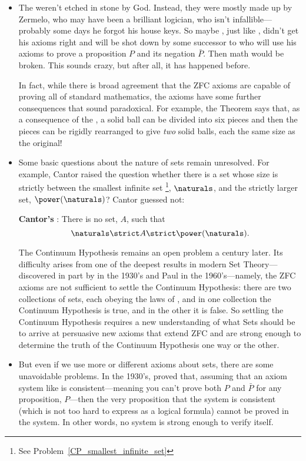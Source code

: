%
\begin{itemize}

\item The  weren't etched in stone by God.  Instead,
  they were mostly made up by Zermelo, who may have been a brilliant
  logician, who isn't infallible---probably some days he forgot his
  house keys.  So maybe , just like , didn't
  get his axioms right and will be shot down by some successor to
   who will use his axioms to prove a proposition $P$ and
  its negation $\bar{P}$.  Then math would be broken.  This sounds
  crazy, but after all, it has happened before.

  In fact, while there is broad agreement that the ZFC axioms are capable
  of proving all of standard mathematics, the axioms have some further
  consequences that sound paradoxical.  For example, the 
  Theorem says that, as a consequence of the , a solid ball
  can be divided into six pieces and then the pieces can be rigidly
  rearranged to give \emph{two} solid balls, each the same size as the
  original!

\item Some basic questions about the nature of sets remain unresolved.
  For example, Cantor raised the question whether there is a set whose
  size is strictly between the smallest infinite set \footnote{See
    Problem~\ref{CP_smallest_infinite_set}}, $\naturals$, and the
  strictly larger set, $\power(\naturals)$?  Cantor guessed not:

  \textbf{Cantor's }: There is no set, $A$,
  such that
  \[
  \naturals \strict A \strict \power(\naturals).
  \]

  The Continuum Hypothesis remains an open problem a century later.
  Its difficulty arises from one of the deepest results in modern Set
  Theory---discovered in part by  in the 1930's and Paul
   in the 1960's---namely, the ZFC axioms are not
  sufficient to settle the Continuum Hypothesis: there are two
  collections of sets, each obeying the laws of , and in one
  collection the Continuum Hypothesis is true, and in the other it is
  false.  So settling the Continuum Hypothesis requires a new
  understanding of what Sets should be to arrive at persuasive new
  axioms that extend ZFC and are strong enough to determine the truth
  of the Continuum Hypothesis one way or the other.

\item But even if we use more or different axioms about sets, there
  are some unavoidable problems.  In the 1930's,  proved
  that, assuming that an axiom system like  is
  consistent---meaning you can't prove both $P$ and $\bar{P}$ for any
  proposition, $P$---then the very proposition that the system is
  consistent (which is not too hard to express as a logical formula)
  cannot be proved in the system.  In other words, no 
  system is strong enough to verify itself.
  
\end{itemize}

